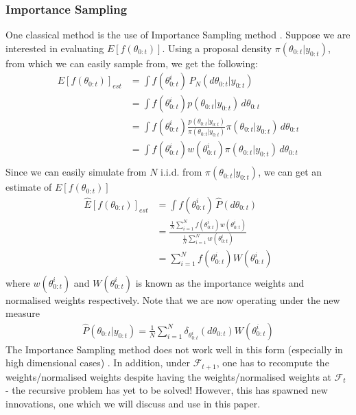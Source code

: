 \documentclass[12pt]{article}
\theoremstyle{definition}
\begin{document}
\subsubsection{Importance Sampling}
One classical method is the use of Importance Sampling method \citep{geweke1989bayesian}. Suppose we are interested in evaluating $E[f(\theta_{0:t})]$. Using a proposal density $\pi(\theta_{0:t}|y_{0:t})$, from which we can easily sample from, we get the following:
\begin{equation}
	\begin{aligned}
		E[f(\theta_{0:t})]_{est} &= \int f(\theta_{0:t}^{i}) \,P_{N}(d\theta_{0:t}|y_{0:t}) \\
		&= \int f(\theta_{0:t}^{i})p(\theta_{0:t}|y_{0:t}) \,d\theta_{0:t} \\
		&= \int f(\theta_{0:t}^{i})\frac{p(\theta_{0:t}|y_{0:t})}{\pi(\theta_{0:t}|y_{0:t})}\pi(\theta_{0:t}|y_{0:t})\,d\theta_{0:t} \\
		&= \int f(\theta_{0:t}^{i})w(\theta_{0:t}^{i})\pi(\theta_{0:t}|y_{0:t})\,d\theta_{0:t} \\
	\end{aligned}
\end{equation}
Since we can easily simulate from $N$ i.i.d. from $\pi(\theta_{0:t}|y_{0:t})$, we can get an estimate of $E[f(\theta_{0:t})]$
\begin{equation}
	\begin{aligned}
		\hat{E}[f(\theta_{0:t})]_{est} &= \int f(\theta_{0:t}^{i})\,\hat{P}(d\theta_{0:t}) \\
		&=\frac{\frac{1}{N}\sum_{i=1}^{N}f(\theta_{0:t}^{i})w(\theta_{0:t}^{i})}{\frac{1}{N}\sum_{i=1}^{N}w(\theta_{0:t}^{i})} \\
		&= \sum_{i=1}^{N}f(\theta_{0:t}^{i})W(\theta_{0:t}^{i}) \\
	\end{aligned}
\end{equation}
where $w(\theta_{0:t}^{i})$ and $W(\theta_{0:t}^{i})$ is known as the importance weights and normalised weights respectively. Note that we are now operating under the new measure 
\begin{equation}
	\begin{aligned}
		\hat{P}(\theta_{0:t}|y_{0:t}) = \frac{1}{N}\sum_{i=1}^{N}\delta_{\theta_{0:t}^{i}}(d\theta_{0:t})W(\theta_{0:t}^{i})
	\end{aligned}
\end{equation}
The Importance Sampling method does not work well in this form (especially in high dimensional cases) \citep{smith2013sequential}. In addition, under $\mathcal{F}_{t+1}$, one has to recompute the weights/normalised weights despite having the weights/normalised weights at $\mathcal{F}_{t}$ - the recursive problem has yet to be solved! However, this has spawned new innovations, one which we will discuss and use in this paper.
\end{document}
